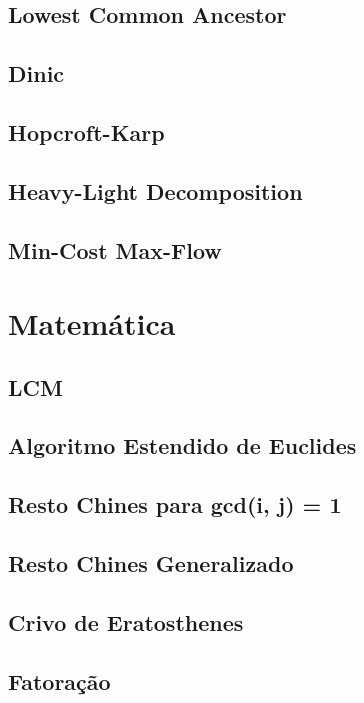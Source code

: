 \documentclass[10pt, letterpaper, twocolumn, twosides]{article}
\begin{document}
\subsection{Lowest Common Ancestor}

\subsection{Dinic}

\subsection{Hopcroft-Karp}

\subsection{Heavy-Light Decomposition}

\subsection{Min-Cost Max-Flow}


\section{Matemática}
\subsection{LCM}

\subsection{Algoritmo Estendido de Euclides}

\subsection{Resto Chines para gcd(i, j) = 1}

\subsection{Resto Chines Generalizado}

\subsection{Crivo de Eratosthenes}

\subsection{Fatoração}

\end{document}
